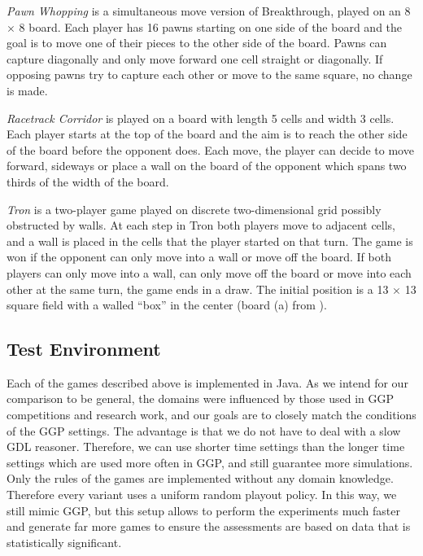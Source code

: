 \documentclass[conference]{IEEEtran}
\begin{document}
\textit{Pawn Whopping} is a simultaneous move version of Breakthrough, played on an 8 $\times$ 8 board. Each player has 
16 pawns starting on one side of the board and the goal is to move one of their pieces to the other side of the board. 
Pawns can capture diagonally and only move forward one cell straight or diagonally.
If opposing pawns try to capture each other or move to the same square, no change is made. 

\textit{Racetrack Corridor} is played on a board with length 5 cells and width 3 cells. Each player starts at the top of the board and the aim is to reach the other side of the board before the opponent does. Each move, the player can decide to move forward, sideways or place a wall on the board of the opponent which spans two thirds of the width of the board.

\textit{Tron} is a two-player game played on discrete two-dimensional grid possibly obstructed by walls. At each
step in Tron both players move to adjacent cells, and a wall is placed in the cells that the player started on that turn. 
The game is won if the opponent can only move into a wall or move off the board. If both players can only move into a wall, can only move off the board or move into each other at the same turn, the game ends in a draw. The initial position is a 13 $\times$ 13 square field with a walled ``box'' in the center (board (a) from \cite{Lanctot13Tron}).
 

\subsection{Test Environment}

Each of the games described above is implemented in Java. As we intend for our comparison to be general, the domains were 
influenced by those used in GGP competitions and research work, and our goals are to closely match the conditions of the 
GGP settings. 
The advantage is that we do not have to deal with a slow GDL reasoner. Therefore, we can use shorter time settings than 
the longer time settings which are used more often in GGP, and still guarantee more simulations. Only the rules of the 
games are implemented without any domain knowledge. Therefore every variant uses a uniform random playout policy. 
In this way, we still mimic GGP, but this setup allows to perform 
the experiments much faster and generate far more games to ensure the assessments are based on data that is statistically
significant. 
\end{document}
